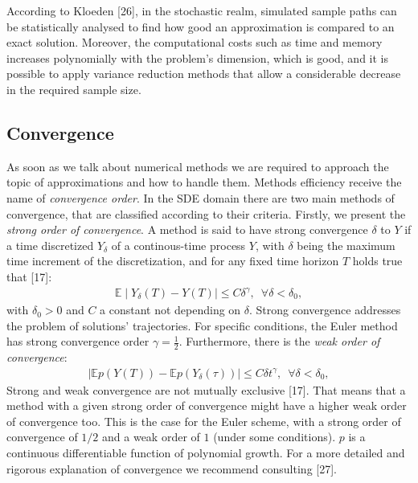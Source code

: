 \documentclass[12pt,twoside]{reedthesis}
\theoremstyle{definition}
\theoremstyle{definition}
\theoremstyle{remark}
\begin{document}
  According to Kloeden {[}26{]}, in the stochastic realm, simulated sample
  paths can be statistically analysed to find how good an approximation is
  compared to an exact solution. Moreover, the computational costs such as
  time and memory increases polynomially with the problem's dimension,
  which is good, and it is possible to apply variance reduction methods
  that allow a considerable decrease in the required sample size.
  
  \subsection{Convergence}\label{convergence}
  
  As soon as we talk about numerical methods we are required to approach
  the topic of approximations and how to handle them. Methods efficiency
  receive the name of \emph{convergence order}. In the SDE domain there
  are two main methods of convergence, that are classified according to
  their criteria. Firstly, we present the \emph{strong order of
  convergence}. A method is said to have strong convergence \(\delta\) to
  \(Y\) if a time discretized \(Y_{\delta}\) of a continous-time process
  \(Y\), with \(\delta\) being the maximum time increment of the
  discretization, and for any fixed time horizon \(T\) holds true that
  {[}17{]}:
  \begin{align*}
  \mathbb{E} \mid Y_{\delta}(T) - Y(T) \mid \leq C \delta^{\gamma}, \,\,\, \forall \delta < \delta_0,
  \end{align*}
  with \(\delta_0 > 0\) and \(C\) a constant not depending on \(\delta\).
  Strong convergence addresses the problem of solutions' trajectories. For
  specific conditions, the Euler method has strong convergence order
  \(\gamma = \frac{1}{2}\). Furthermore, there is the \emph{weak order of
  convergence}:
  \begin{align*}
  \mid  \mathbb{E}p(Y(T)) - \mathbb{E}p(Y_\delta(\tau)) \mid \leq C \delta t^{\gamma}, \,\,\, \forall \delta < \delta_0,
  \end{align*}
  Strong and weak convergence are not mutually exclusive {[}17{]}. That
  means that a method with a given strong order of convergence might have
  a higher weak order of convergence too. This is the case for the Euler
  scheme, with a strong order of convergence of \(1/2\) and a weak order
  of \(1\) (under some conditions). \(p\) is a continuous differentiable
  function of polynomial growth. For a more detailed and rigorous
  explanation of convergence we recommend consulting {[}27{]}.
  
\end{document}
